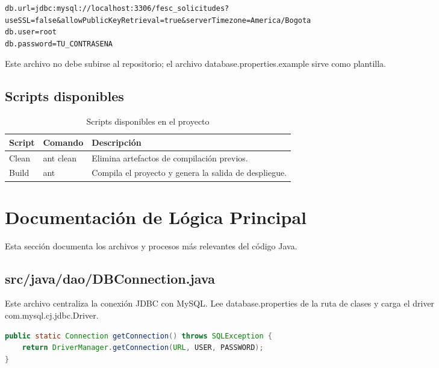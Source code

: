 \documentclass[12pt,letterpaper]{article}
\newcommand{\code}[1]{\texorpdfstring{\begingroup\normalfont\normalsize\def\_{\textunderscore\allowbreak}#1\endgroup}{#1}}
\begin{document}
\begin{lstlisting}[language={}]
db.url=jdbc:mysql://localhost:3306/fesc_solicitudes?useSSL=false&allowPublicKeyRetrieval=true&serverTimezone=America/Bogota
db.user=root
db.password=TU_CONTRASENA
\end{lstlisting}

Este archivo no debe subirse al repositorio; el archivo \code{database.properties.example} sirve como plantilla.

\subsection{Scripts disponibles}

\begin{longtable}{|p{}|p{}|p{}|}
\caption{Scripts disponibles en el proyecto}\\
\hline
\textbf{Script} & \textbf{Comando} & \textbf{Descripción} \\
\hline
Clean & \code{ant clean} & Elimina artefactos de compilación previos. \\
\hline
Build & \code{ant} & Compila el proyecto y genera la salida de despliegue. \\
\hline
\end{longtable}

\section{Documentación de Lógica Principal}

Esta sección documenta los archivos y procesos más relevantes del código Java.

\subsection{\texorpdfstring{\code{src/java/dao/DBConnection.java}}{src/java/dao/DBConnection.java}}

Este archivo centraliza la conexión JDBC con MySQL. Lee \code{database.properties} de la ruta de clases y carga el driver \code{com.mysql.cj.jdbc.Driver}.

\begin{lstlisting}[language=java]
public static Connection getConnection() throws SQLException {
    return DriverManager.getConnection(URL, USER, PASSWORD);
}
\end{lstlisting}
\end{document}
